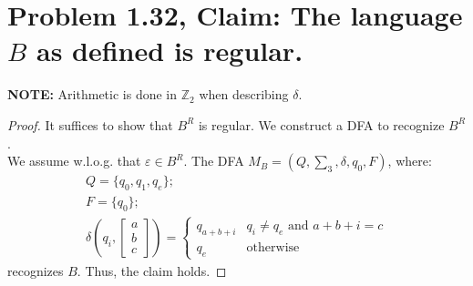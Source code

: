 \documentclass[12pt]{article}
\begin{document}
\section*{Problem 1.32, Claim: The language $B$ as defined is regular.}
\textbf{NOTE:} Arithmetic is done in $\mathbb{Z}_{2}$ when describing $\delta$.
\begin{proof}
	It suffices to show that $B^{R}$ is regular. We construct a DFA to recognize $B^{R}$. \\
	\newline
	We assume w.l.o.g. that $\varepsilon \in B^{R}$. The DFA $M_{B} = (Q, \sum_{3}, \delta, q_{0}, F)$, where:
	\begin{align}
		Q = \{q_{0}, q_{1}, q_{e}\}; \\
		F = \{q_{0}\}; \\
		\delta\left(q_{i}, \begin{bmatrix} a \\ b \\ c \end{bmatrix}\right) = \begin{cases} q_{a + b + i} & q_{i} \neq q_{e} \text{ and } a + b + i = c \\ q_{e} & \text{otherwise}\end{cases}
	\end{align}
	recognizes $B$. Thus, the claim holds.
\end{proof}
\end{document}
